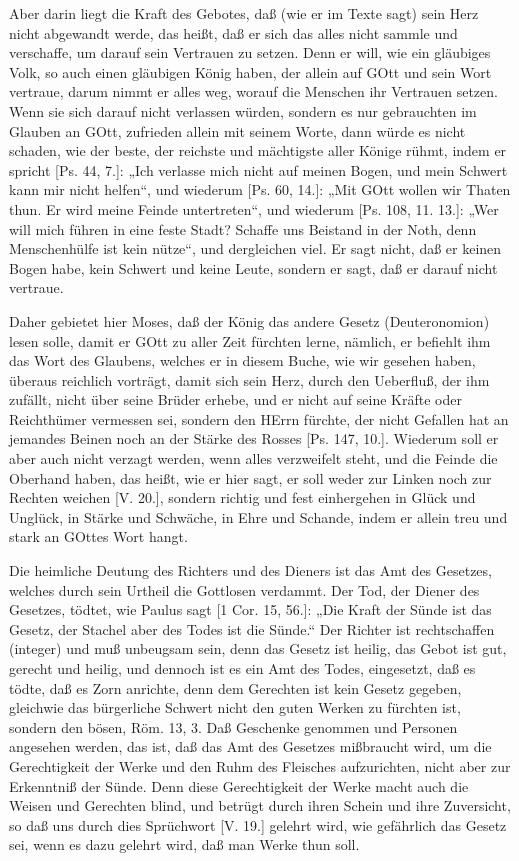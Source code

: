 Aber darin liegt die Kraft des Gebotes, daß (wie er im Texte sagt) sein Herz nicht abgewandt werde, das heißt, daß er sich das alles nicht sammle und verschaffe, um darauf sein Vertrauen zu setzen. Denn er will, wie ein gläubiges Volk, so auch einen gläubigen König haben, der allein auf GOtt und sein Wort vertraue, darum nimmt er alles weg, worauf die Menschen ihr Vertrauen setzen. Wenn sie sich darauf nicht verlassen würden, sondern es nur gebrauchten im Glauben an GOtt, zufrieden allein mit seinem Worte, dann würde es nicht schaden, wie der beste, der reichste und mächtigste aller Könige rühmt, indem er spricht [Ps. 44, 7.]: „Ich verlasse mich nicht auf meinen Bogen, und mein Schwert kann mir nicht helfen“, und wiederum [Ps. 60, 14.]: „Mit GOtt wollen wir Thaten thun. Er wird meine Feinde untertreten“, und wiederum [Ps. 108, 11. 13.]: „Wer will mich führen in eine feste Stadt? Schaffe uns Beistand in der Noth, denn Menschenhülfe ist kein nütze“, und dergleichen viel. Er sagt nicht, daß er keinen Bogen habe, kein Schwert und keine Leute, sondern er sagt, daß er darauf nicht vertraue.

Daher gebietet hier Moses, daß der König das andere Gesetz (Deuteronomion) lesen solle, damit er GOtt zu aller Zeit fürchten lerne, nämlich, er befiehlt ihm das Wort des Glaubens, welches er in diesem Buche, wie wir gesehen haben, überaus reichlich vorträgt, damit sich sein Herz, durch den Ueberfluß, der ihm zufällt, nicht über seine Brüder erhebe, und er nicht auf seine Kräfte oder Reichthümer vermessen sei, sondern den HErrn fürchte, der nicht Gefallen hat an jemandes Beinen noch an der Stärke des Rosses [Ps. 147, 10.]. Wiederum soll er aber auch nicht verzagt werden, wenn alles verzweifelt steht, und die Feinde die Oberhand haben, das heißt, wie er hier sagt, er soll weder zur Linken noch zur Rechten weichen [V. 20.], sondern richtig und fest einhergehen in Glück und Unglück, in Stärke und Schwäche, in Ehre und Schande, indem er allein treu und stark an GOttes Wort hangt.

Die heimliche Deutung des Richters und des Dieners ist das Amt des Gesetzes, welches durch sein Urtheil die Gottlosen verdammt. Der Tod, der Diener des Gesetzes, tödtet, wie Paulus sagt [1 Cor. 15, 56.]: „Die Kraft der Sünde ist das Gesetz, der Stachel aber des Todes ist die Sünde.“ Der Richter ist rechtschaffen (integer) und muß unbeugsam sein, denn das Gesetz ist heilig, das Gebot ist gut, gerecht und heilig, und dennoch ist es ein Amt des Todes, eingesetzt, daß es tödte, daß es Zorn anrichte, denn dem Gerechten ist kein Gesetz gegeben, gleichwie das bürgerliche Schwert nicht den guten Werken zu fürchten ist, sondern den bösen, Röm. 13, 3. Daß Geschenke genommen und Personen angesehen werden, das ist, daß das Amt des Gesetzes mißbraucht wird, um die Gerechtigkeit der Werke und den Ruhm des Fleisches aufzurichten, nicht aber zur Erkenntniß der Sünde. Denn diese Gerechtigkeit der Werke macht auch die Weisen und Gerechten blind, und betrügt durch ihren Schein und ihre Zuversicht, so daß uns durch dies Sprüchwort [V. 19.] gelehrt wird, wie gefährlich das Gesetz sei, wenn es dazu gelehrt wird, daß man Werke thun soll.

